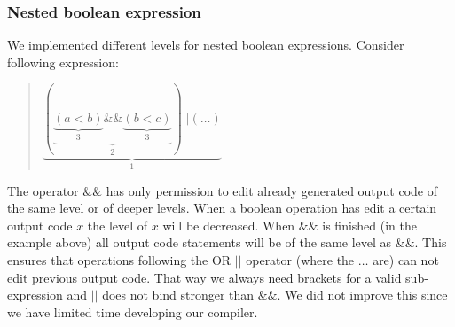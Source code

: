 \subsubsection{Nested boolean expression}
We implemented different levels for nested boolean expressions.
Consider following expression: 
\begin{quote}
$\underbrace{(\underbrace{\underbrace{(a<b)}_{3}\&\&\underbrace{(b<c)}_{3}}_{2})||(\ldots)}_1 $
\end{quote}
The operator $ \&\& $ has only permission to edit already generated output code of the same level or of deeper levels. When a
boolean operation has edit a certain output code $x$ the level of $x$ will be decreased. When $ \&\& $ is finished (in the example above)
 all output code statements will be of the same level as $ \&\& $. This ensures that operations following the OR $||$ operator (where the
$\ldots$ are) can not edit previous output code.
That way we always need brackets for a valid sub-expression and $||$ does not bind stronger than $ \&\& $. We did not improve this since
we have limited time developing our compiler.

